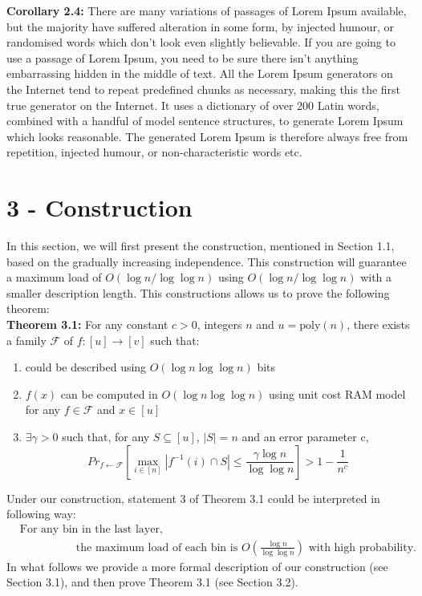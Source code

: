 \documentclass[letterpaper]{article} %
\begin{document}
	\noindent\textbf{Corollary 2.4:} There are many variations of passages of Lorem Ipsum available, but the majority have suffered alteration in some form, by injected humour, or randomised words which don't look even slightly believable. If you are going to use a passage of Lorem Ipsum, you need to be sure there isn't anything embarrassing hidden in the middle of text. All the Lorem Ipsum generators on the Internet tend to repeat predefined chunks as necessary, making this the first true generator on the Internet. It uses a dictionary of over 200 Latin words, combined with a handful of model sentence structures, to generate Lorem Ipsum which looks reasonable. The generated Lorem Ipsum is therefore always free from repetition, injected humour, or non-characteristic words etc. \\
	
	
	\section{3 - Construction}
	In this section, we will first present the construction, mentioned in Section 1.1, based on the gradually increasing independence. This construction will guarantee a maximum load of  $O(\log n/\log\log n)$ using $O(\log n/\log\log n)$ with a smaller description length. This constructions allows us to prove the following theorem: \\
	
	\noindent\textbf{Theorem 3.1:} For any constant $c>0$, integers $n$ and $u=\text{poly}(n)$, there exists a family  $\mathscr{F}$ of $f:[u]\rightarrow[v]$ such that:
	\begin{enumerate}
	\item could be described using $O(\log n \log\log n)$ bits
	\item $f(x)$ can be computed in $O(\log n \log\log n)$ using unit cost RAM model for any $f\in \mathscr{F}$ and $x\in[u]$
	\item $\exists \gamma>0$ such that, for any $S\subseteq[u]$, $|S|=n$ and an error parameter c,
		$${Pr}_{f\leftarrow \mathscr{F}}\left[\max_{i\in[n]}|f^{-1}(i) \cap S|\le \frac{\gamma\log n}{\log\log n}\right]> 1-\frac1{n^c}$$
	\end{enumerate}
	Under our construction, statement 3 of Theorem 3.1 could be interpreted in following way:
	\begin{align*}
	&\text{For any bin in the last layer,}\\
	& \qquad\qquad\quad\text{the maximum load of each bin is } O(\frac{\log n}{\log\log n}) \text{ with high probability.}
	\end{align*}
	In what follows we provide a more formal description of our construction (see Section 3.1), and then prove Theorem 3.1 (see Section 3.2).
	
\end{document}
